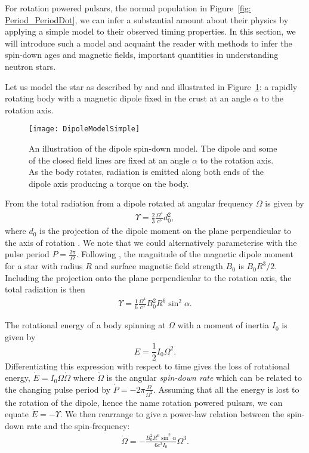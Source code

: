For rotation powered pulsars, the normal population in Figure~\ref{fig:
Period_PeriodDot}, we can infer a substantial amount about their physics by
applying a simple model to their observed timing properties. In this section,
we will introduce such a model and acquaint the reader with methods to infer
the spin-down ages and magnetic fields, important quantities in understanding
neutron stars.

Let us model the
star as described by \citet{Pacini1967} and \citet{Gold1968} and illustrated in
Figure~\ref{fig: DipoleSpindownSimple}: a rapidly rotating
body with a magnetic dipole fixed in the crust at an angle $\alpha$ to the rotation
axis.
\begin{figure}[htb]
    \centering
    \texttt{[image: DipoleModelSimple]}
    \caption{An illustration of the dipole spin-down model. The dipole and some 
    of the closed field lines are fixed at an angle $\alpha$ to the rotation 
    axis. As the body rotates, radiation is emitted along both ends of the dipole
    axis producing a torque on the body.}
    \label{fig: DipoleSpindownSimple}
\end{figure}

From \citet{Landau2013classical} the total radiation from a dipole rotated at
angular frequency $\Omega$ is given by
\begin{align}
\Upsilon = \frac{2}{3}\frac{\Omega^{4}}{c^{3}} d_{0}^{2},
\end{align}
where $d_0$ is the projection of the dipole moment on the plane perpendicular
to the axis of rotation \citep{Pacini1967}. We note that we could alternatively
parameterise with the pulse period $P=\frac{2\pi}{\Omega}$.
Following \citet{Shapiro83}, the
magnitude of the magnetic dipole moment for a star with radius $R$ and surface magnetic
field strength $B_0$ is $B_{0}R^{3}/2$. Including the projection onto the
plane perpendicular to the rotation axis, the total radiation is then
\begin{align}
\Upsilon = \frac{1}{6}\frac{\Omega^{4}}{c^{3}} B_0^2 R^{6} \sin^{2}\alpha.
\end{align}

The rotational energy of a body spinning at $\Omega$ with a moment of inertia
$I_{0}$ is given by
\begin{equation}
    E = \frac{1}{2}I_{0}\Omega^{2}.
\end{equation}
Differentiating this expression with respect to time gives the loss of rotational
energy, $\dot{E}=I_0 \Omega\dot{\Omega}$ where $\dot{\Omega}$ is the angular
\emph{spin-down rate} which can be related to the changing pulse period by
$\dot{P}=-2\pi\frac{\dot{\Omega}}{\Omega^{2}}$.
Assuming that all the energy is lost
to the rotation of the dipole, hence the name rotation powered pulsars, we can
equate $\dot{E} = -\Upsilon$. We then rearrange
to give a power-law relation between the spin-down rate and the spin-frequency:
\begin{align}
\dot{\Omega} = -\frac{B_0^{2} R^{6} \sin^{2}\alpha}{6 c^{3} I_0} \Omega^{3}.
\label{eqn: n3 braking}
\end{align}

